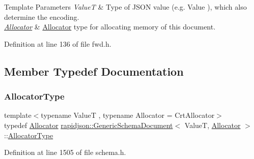 \begin{DoxyTemplParams}{Template Parameters}
{\em ValueT} & Type of J\+S\+ON value (e.\+g. {\ttfamily Value} ), which also determine the encoding. \\
\hline
{\em \mbox{\hyperlink{classrapidjson_1_1_allocator}{Allocator}}} & \mbox{\hyperlink{classrapidjson_1_1_allocator}{Allocator}} type for allocating memory of this document. \\
\hline
\end{DoxyTemplParams}


Definition at line 136 of file fwd.\+h.



\subsection{Member Typedef Documentation}
\mbox{\label{classrapidjson_1_1_generic_schema_document_a6fc497ef6e303b3a3ecec9fefe82eade}} 
\subsubsection{\texorpdfstring{AllocatorType}{AllocatorType}}
{\footnotesize\ttfamily template$<$typename ValueT , typename Allocator  = Crt\+Allocator$>$ \\
typedef \mbox{\hyperlink{classrapidjson_1_1_allocator}{Allocator}} \mbox{\hyperlink{classrapidjson_1_1_generic_schema_document}{rapidjson\+::\+Generic\+Schema\+Document}}$<$ ValueT, \mbox{\hyperlink{classrapidjson_1_1_allocator}{Allocator}} $>$\+::\mbox{\hyperlink{classrapidjson_1_1_generic_schema_document_a6fc497ef6e303b3a3ecec9fefe82eade}{Allocator\+Type}}}



Definition at line 1505 of file schema.\+h.

\mbox{\label{classrapidjson_1_1_generic_schema_document_af9b82162834b30bdcbe93cb065d0aedd}} 
